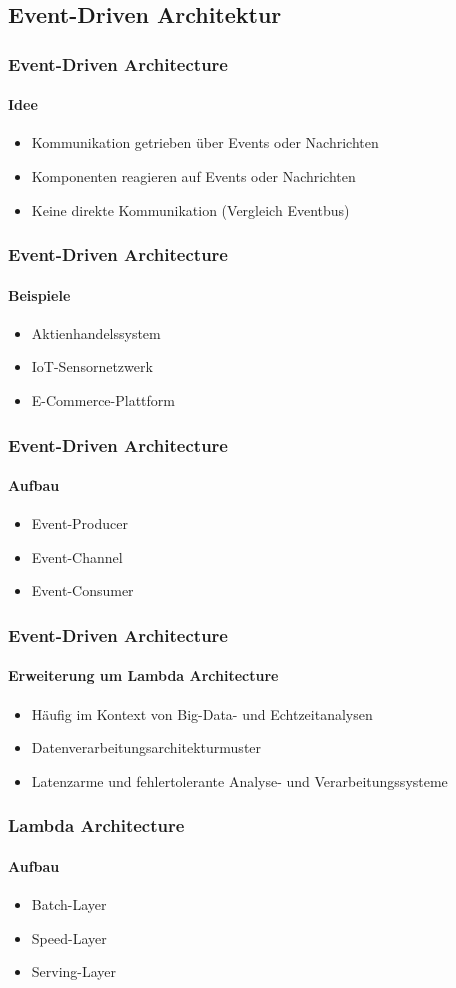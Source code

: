 \subsection{Event-Driven Architektur}
\begin{frame}
  \frametitle{Event-Driven Architecture}
  \framesubtitle{Idee}
  \begin{itemize}
    \item Kommunikation getrieben über Events oder Nachrichten
    \item Komponenten reagieren auf Events oder Nachrichten
    \item Keine direkte Kommunikation (Vergleich Eventbus)
  \end{itemize}
\end{frame}

\begin{frame}
  \frametitle{Event-Driven Architecture}
  \framesubtitle{Beispiele}
  \begin{itemize}
    \item Aktienhandelssystem
    \item IoT-Sensornetzwerk
    \item E-Commerce-Plattform
  \end{itemize}
\end{frame}

\begin{frame}
  \frametitle{Event-Driven Architecture}
  \framesubtitle{Aufbau}
  \begin{itemize}
    \item Event-Producer
    \item Event-Channel
    \item Event-Consumer
  \end{itemize}
\end{frame}

\begin{frame}
  \frametitle{Event-Driven Architecture}
  \framesubtitle{Erweiterung um Lambda Architecture}
  \begin{itemize}
    \item Häufig im Kontext von Big-Data- und Echtzeitanalysen
    \item Datenverarbeitungsarchitekturmuster
    \item Latenzarme und fehlertolerante Analyse- und Verarbeitungssysteme
  \end{itemize}
\end{frame}

\begin{frame}
  \frametitle{Lambda Architecture}
  \framesubtitle{Aufbau}
  \begin{itemize}
    \item Batch-Layer
    \item Speed-Layer
    \item Serving-Layer
  \end{itemize}
\end{frame}


